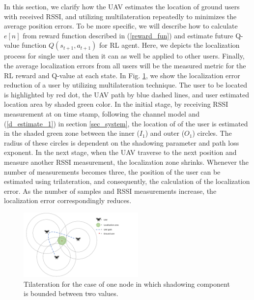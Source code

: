 \documentclass[journal,twocolumn]{IEEEtran}
\begin{document}
In this section, we clarify how the UAV estimates the location of ground users with received RSSI, and utilizing multilateration repeatedly to minimizes the average position errors. To be more specific, we will describe how to calculate $e[n]$ from reward function described in (\ref{reward_fun}) and estimate future Q-value function $Q(s_{t+1},a_{t+1})$ for RL agent. Here, we depicts the localization process for single user and then it can as well be applied to other users. Finally, the average localization errors from all users will be the measured metric for the RL reward and Q-value at each state.
In Fig. \ref{fig.fig_2}, we show the localization error reduction of a user by utilizing multilateration technique. The user to be located is highlighted by red dot, the UAV path by blue dashed lines, and user estimated location area by shaded green color. In the initial stage, by receiving RSSI measurement at on time stamp, following the channel model and (\ref{d_estimate_1}) in section \ref{sec_system}, the location of of the user is estimated in the shaded green zone between the inner ($I_1$) and outer ($O_1$) circles. The radius of these circles is dependent on the shadowing parameter and path loss exponent. In the next stage, when the UAV traverse to the next position and measure another RSSI measurement, the localization zone shrinks. Whenever the number of measurements becomes three, the position of the user can be estimated using trilateration, and consequently, the calculation of the localization error. As the number of samples and RSSI measurements increase, the localization error correspondingly reduces.

\begin{figure}[t!]
\vspace{-10pt}
  \centering
  \includegraphics[width=0.55\textwidth]{Figures/fig2.pdf}
    \vspace*{-1mm}
  \caption{Tilateration for the case of one node in which shadowing component is bounded between two values.}\label{fig.fig_2}
\end{figure}
\end{document}
